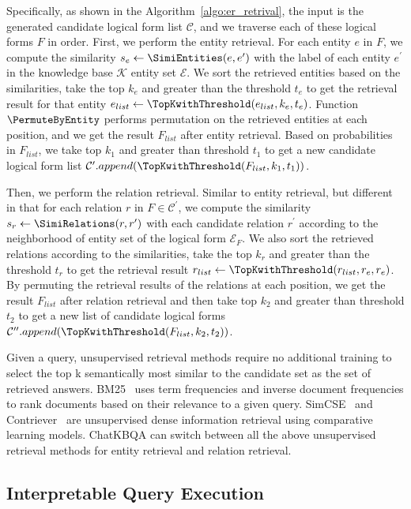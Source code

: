 \documentclass{article} \usepackage{iclr2024_conference,times}
\begin{document}
Specifically, as shown in the Algorithm~\ref{algo:er_retrival}, the input is the generated candidate logical form list $\mathcal{C}$, and we traverse each of these logical forms $F$ in order. First, we perform the entity retrieval. For each entity $e$ in $F$, we compute the similarity $s_e \leftarrow \SimiEntities(e, e^\prime)$ with the label of each entity $e^\prime$ in the knowledge base $\mathcal{K}$ entity set $\mathcal{E}$. We sort the retrieved entities based on the similarities, take the top $k_e$ and greater than the threshold $t_e$ to get the retrieval result for that entity $e_{list} \leftarrow \TopKwithThreshold(e_{list}, k_e, t_e)$. Function $\PermuteByEntity$ performs permutation on the retrieved entities at each position, and we get the result $F_{list}$ after entity retrieval. Based on probabilities in $F_{list}$, we take top $k_1$ and greater than threshold $t_1$ to get a new candidate logical form list $\mathcal{C}^\prime.append(\TopKwithThreshold(F_{list}, k _1, t_1))$.

Then, we perform the relation retrieval. Similar to entity retrieval, but different in that for each relation $r$ in $F \in \mathcal{C}^\prime$, we compute the similarity $s_r \leftarrow \SimiRelations(r, r^\prime)$ with each candidate relation $r^\prime$ according to the neighborhood of entity set of the logical form $\mathcal{E}_{F}$. We also sort the retrieved relations according to the similarities, take the top $k_r$ and greater than the threshold $t_r$ to get the retrieval result $r_{list} \leftarrow \TopKwithThreshold(r_{list}, r_e, r_e)$. By permuting the retrieval results of the relations at each position, we get the result $F_{list}$ after relation retrieval and then take top $k_2$ and greater than threshold $t_2$ to get a new list of candidate logical forms $\mathcal{C}^{\prime\prime}.append(\TopKwithThreshold(F_{list}, k_2, t_2))$.

Given a query, unsupervised retrieval methods require no additional training to select the top k semantically most similar to the candidate set as the set of retrieved answers. BM25~\citep{BM25} uses term frequencies and inverse document frequencies to rank documents based on their relevance to a given query. SimCSE~\citep{SimCSE} and Contriever~\citep{Contriever} are unsupervised dense information retrieval using comparative learning models. ChatKBQA can switch between all the above unsupervised retrieval methods for entity retrieval and relation retrieval. 

\subsection{Interpretable Query Execution}
\end{document}
